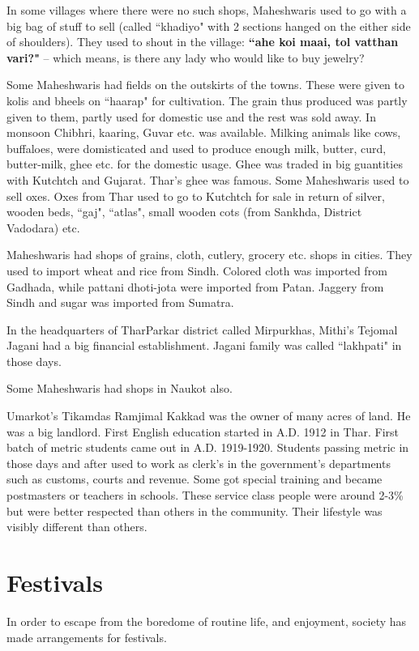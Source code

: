 In some villages where there were no such shops, Maheshwaris used to go with a
big bag of stuff to sell (called ``khadiyo" with 2 sections hanged on the either
side of shoulders). They used to shout in the village: \textbf{``ahe koi maai,
tol vatthan vari?"} -- which means, is there any lady who would like to buy
jewelry?

Some Maheshwaris had fields on the outskirts of the towns. These were given to
kolis and bheels on ``haarap" for cultivation. The grain thus produced was
partly given to them, partly used for domestic use and the rest was sold away.
In monsoon Chibhri, kaaring, Guvar etc. was available. Milking animals like
cows, buffaloes, were domisticated and used to produce enough milk, butter,
curd, butter-milk, ghee etc. for the domestic usage. Ghee was traded in big
guantities with Kutchtch and Gujarat. Thar's ghee was famous. Some Maheshwaris
used to sell oxes. Oxes from Thar used to go to Kutchtch for sale in return of
silver, wooden beds, ``gaj", ``atlas", small wooden cots (from Sankhda, District
Vadodara) etc.

Maheshwaris had shops of grains, cloth, cutlery, grocery etc. shops in cities.
They used to import wheat and rice from Sindh. Colored cloth was imported from
Gadhada, while pattani dhoti-jota were imported from Patan. Jaggery from Sindh
and sugar was imported from Sumatra.

In the headquarters of TharParkar district called Mirpurkhas, Mithi's Tejomal
Jagani had a big financial establishment. Jagani family was called ``lakhpati"
in those days.

Some Maheshwaris had shops in Naukot also.

Umarkot's Tikamdas Ramjimal Kakkad was the owner of many acres of land. He was a
big landlord. First English education started in A.D. 1912 in Thar. First batch
of metric students came out in A.D. 1919-1920. Students passing metric  in those
days and after used to work as clerk's in the government's departments such as
customs, courts and revenue. Some got special training and became postmasters or
teachers in schools. These service class people were around 2-3\% but were
better respected than others in the community. Their lifestyle was visibly
different than others.
\section{Festivals}
In order to escape from the boredome of routine life, and enjoyment,  society has made
arrangements for festivals. 
